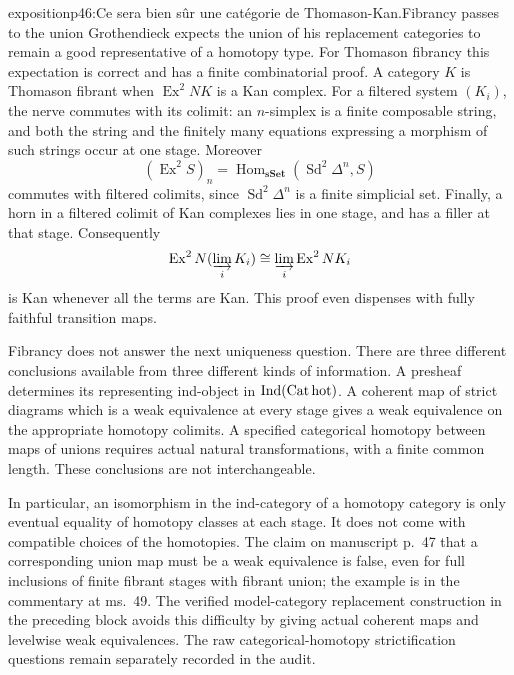\begin{dcomment}{exposition}{p46:Ce sera bien sûr une catégorie de Thomason-Kan.}{Fibrancy passes to the union}
Grothendieck expects the union of his replacement categories to remain a good representative of a homotopy type. For Thomason fibrancy this expectation is correct and has a finite combinatorial proof. A category $K$ is Thomason fibrant when $\operatorname{Ex}^2NK$ is a Kan complex. For a filtered system $(K_i)$, the nerve commutes with its colimit: an $n$-simplex is a finite composable string, and both the string and the finitely many equations expressing a morphism of such strings occur at one stage. Moreover
\[
 (\operatorname{Ex}^2 S)_n
   =\operatorname{Hom}_{\mathbf{sSet}}(\operatorname{Sd}^2\Delta^n,S)
\]
commutes with filtered colimits, since $\operatorname{Sd}^2\Delta^n$ is a finite simplicial set. Finally, a horn in a filtered colimit of Kan complexes lies in one stage, and has a filler at that stage. Consequently
\[
 \operatorname{Ex}^2N(\varinjlim_i K_i)
       \cong\varinjlim_i\operatorname{Ex}^2NK_i
\]
is Kan whenever all the terms are Kan. This proof even dispenses with fully faithful transition maps.

Fibrancy does not answer the next uniqueness question. There are three different conclusions available from three different kinds of information. A presheaf determines its representing ind-object in $\operatorname{Ind}(\mathrm{Cat\,hot})$. A coherent map of strict diagrams which is a weak equivalence at every stage gives a weak equivalence on the appropriate homotopy colimits. A specified categorical homotopy between maps of unions requires actual natural transformations, with a finite common length. These conclusions are not interchangeable.

In particular, an isomorphism in the ind-category of a homotopy category is only eventual equality of homotopy classes at each stage. It does not come with compatible choices of the homotopies. The claim on manuscript p.~47 that a corresponding union map must be a weak equivalence is false, even for full inclusions of finite fibrant stages with fibrant union; the example is in the commentary at ms.~49. The verified model-category replacement construction in the preceding block avoids this difficulty by giving actual coherent maps and levelwise weak equivalences. The raw categorical-homotopy strictification questions remain separately recorded in the audit.
\end{dcomment}


